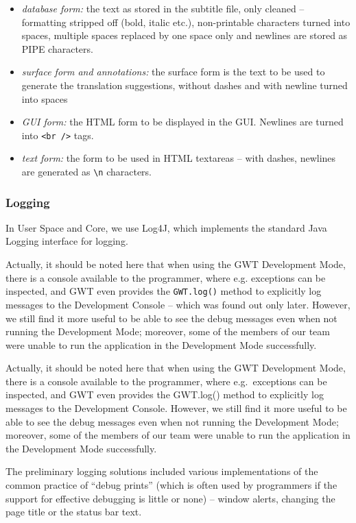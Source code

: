 \begin{itemize}
	\item \emph{database form:} the text as stored in the subtitle file, only cleaned -- formatting stripped off (bold, italic etc.), non-printable characters turned into spaces, multiple spaces replaced by one space only and newlines are stored as PIPE characters.
	\item \emph{surface form and annotations:} the surface form is the text to be used to generate the translation suggestions, without dashes and with newline turned into spaces
	\item \emph{GUI form:} the HTML form to be displayed in the GUI. Newlines are turned into {\tt <br />} tags.
	\item \emph{text form:} the form to be used in HTML textareas -- with dashes, newlines are generated as {\tt \verb#\n#} characters.
\end{itemize}


\subsubsection{Logging}

In User Space and Core, we use Log4J, which implements the standard Java Logging interface for logging.

Actually, it should be noted here that when using the GWT Development Mode, there is a console available to the programmer, where e.g. exceptions can be inspected, and GWT even provides the {\tt GWT.log()} method to explicitly log messages to the Development Console -- which was found out only later. However, we still find it more useful to be able to see the debug messages even when not running the Development Mode; moreover, some of the members of our team were unable to run the application in the Development Mode successfully.

Actually, it should be noted here that when using the GWT Development Mode, there is a console available to the programmer, where e.g.\ exceptions can be inspected, and GWT even provides the GWT.log() method to explicitly log messages to the Development Console. However, we still find it more useful to be able to see the debug messages even when not running the Development Mode; moreover, some of the members of our team were unable to run the application in the Development Mode successfully.

The preliminary logging solutions included various implementations of the common practice of ``debug prints'' (which is often used by programmers if the support for effective debugging is little or none) --
window alerts, changing the page title or the status bar text.

